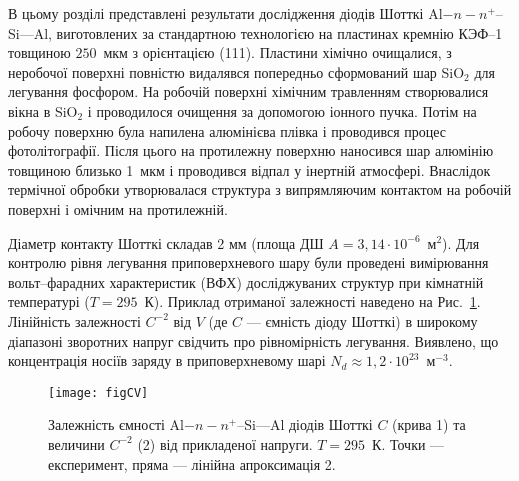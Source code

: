 

В цьому розділі представлені результати дослідження діодів Шотткі Al$-n-n^+$--Si---Al,
виготовлених за стандартною технологією \cite{Vorobets:FM2003,StrihaBook1987} на пластинах кремнію КЭФ--1 товщиною $250$~мкм
з орієнтацією (111).
Пластини хімічно очищалися, з неробочої поверхні
повністю видалявся попередньо сформований шар SiO$_2$ для легування фосфором.
На робочій поверхні хімічним травленням створювалися вікна в SiO$_2$ і проводилося очищення
за допомогою іонного пучка.
Потім на робочу поверхню була напилена алюмінієва плівка і проводився процес фотолітографії.
Після цього на протилежну поверхню наносився шар алюмінію товщиною близько 1~мкм і проводився відпал
у інертній атмосфері.
Внаслідок термічної обробки утворювалася структура з випрямляючим контактом на робочій поверхні і омічним на протилежній.

Діаметр контакту Шотткі складав 2 мм (площа ДШ $A=3,14\cdot10^{-6}$~м$^2$).
Для контролю рівня легування приповерхневого шару були проведені
вимірювання вольт--фарадних характеристик (ВФХ) досліджуваних структур при кімнатній температурі ($T = 295$~К).
Приклад отриманої залежності наведено на Рис.~\ref{figCV}.
Лінійність залежності $C^{-2}$ від $V$
(де $C$ --- ємність діоду Шотткі)
в широкому діапазоні зворотних напруг свідчить про рівномірність легування.
Виявлено, що концентрація носіїв заряду в приповерхневому шарі $N_d\approx1,2\cdot10^{23}$~м$^{-3}$.


\begin{figure}
\center
\texttt{[image: figCV]}
\caption{\label{figCV}
Залежність ємності Al$-n-n^+$--Si---Al діодів Шотткі $C$ (крива 1) та величини $C^{-2}$ (2) від прикладеної напруги.
$T=295$~К.
Точки --- експеримент, пряма --- лінійна апроксимація 2.
}%
\end{figure}











